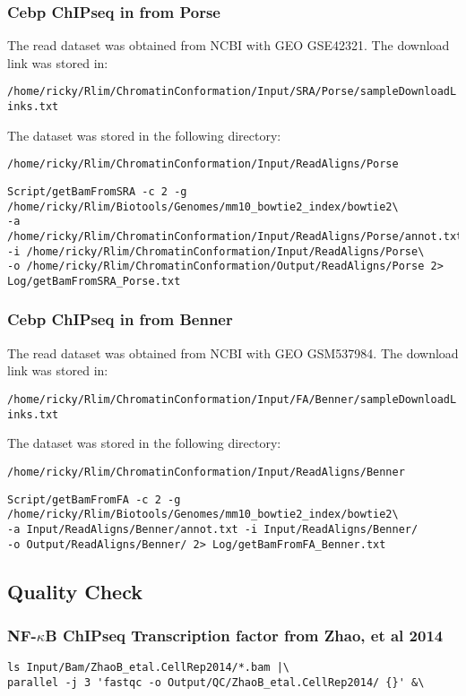\documentclass{article}\usepackage[]{graphicx}\usepackage[]{color}
\begin{document}
\subsubsection{Cebp ChIPseq in from Porse}
The read dataset was obtained from NCBI with GEO GSE42321. 
The download link was stored in: 

\verb|/home/ricky/Rlim/ChromatinConformation/Input/SRA/Porse/sampleDownloadLinks.txt|

The dataset was stored in the following directory:

\verb|/home/ricky/Rlim/ChromatinConformation/Input/ReadAligns/Porse|            

\begin{verbatim}
Script/getBamFromSRA -c 2 -g /home/ricky/Rlim/Biotools/Genomes/mm10_bowtie2_index/bowtie2\ 
-a /home/ricky/Rlim/ChromatinConformation/Input/ReadAligns/Porse/annot.txt 
-i /home/ricky/Rlim/ChromatinConformation/Input/ReadAligns/Porse\
-o /home/ricky/Rlim/ChromatinConformation/Output/ReadAligns/Porse 2> Log/getBamFromSRA_Porse.txt 
\end{verbatim}

\subsubsection{Cebp ChIPseq in from Benner}
The read dataset was obtained from NCBI with GEO GSM537984. 
The download link was stored in:

\verb|/home/ricky/Rlim/ChromatinConformation/Input/FA/Benner/sampleDownloadLinks.txt|

The dataset was stored in the following directory:

\verb|/home/ricky/Rlim/ChromatinConformation/Input/ReadAligns/Benner|            

\begin{verbatim}
Script/getBamFromFA -c 2 -g /home/ricky/Rlim/Biotools/Genomes/mm10_bowtie2_index/bowtie2\
-a Input/ReadAligns/Benner/annot.txt -i Input/ReadAligns/Benner/ 
-o Output/ReadAligns/Benner/ 2> Log/getBamFromFA_Benner.txt
\end{verbatim}


\subsection{Quality Check}
\subsubsection{NF-$\kappa$B ChIPseq Transcription factor from Zhao, et al 2014}
\begin{verbatim}
ls Input/Bam/ZhaoB_etal.CellRep2014/*.bam |\ 
parallel -j 3 'fastqc -o Output/QC/ZhaoB_etal.CellRep2014/ {}' &\
\end{verbatim}
\end{document}
